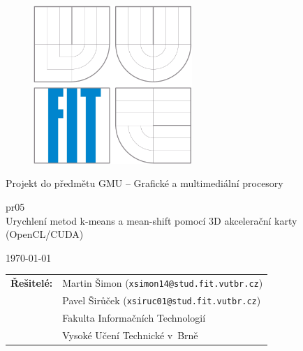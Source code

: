\begin{titlepage}

\vspace*{1cm}

\begin{figure}
  \centering
  \includegraphics[height=6cm]{images/fit}
\end{figure}

\vspace*{5mm}

\begin{center}
\begin{Large}
Projekt do předmětu GMU -- Grafické a multimediální procesory
\end{Large}
\end{center}

\vspace*{5mm}

\begin{center}
\begin{Huge}
pr05\\Urychlení metod k-means a mean-shift pomocí 3D akcelerační karty (OpenCL/CUDA) \\
\end{Huge}
\end{center}

\vspace*{1cm}

\begin{center}
\begin{Large}
\today
\end{Large}
\end{center}

\vfill

\begin{flushleft}
\begin{large}
\begin{tabular}{ll}

\bf Řešitelé:\hspace{3mm} & Martin Šimon (\verb_xsimon14@stud.fit.vutbr.cz_) \\
& Pavel Širůček (\verb_xsiruc01@stud.fit.vutbr.cz_) \\
& Fakulta Informačních Technologií \\
& Vysoké Učení Technické v~Brně

\end{tabular}
\end{large}
\end{flushleft}

\end{titlepage}

